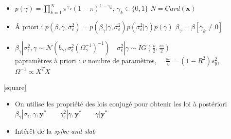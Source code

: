 \begin{frame}
        \begin{itemize}
            \item  $\displaystyle p(\gamma)=\prod_{k=1}^{N} \pi^{\gamma_k}(1-\pi)^{1-\gamma_k}$, $\gamma_k \in \{0,1 \}$ {\small $N = Card(\mathbf{x})$} 
            \item \'A priori : $p\left(\beta, \gamma, \sigma_{\varepsilon}^{2}\right)=p\left(\beta_{\gamma} | \gamma, \sigma_{\varepsilon}^{2}\right) p\left(\sigma_{\varepsilon}^{2} | \gamma\right) p(\gamma)$ 
            \hfill $\beta_{\gamma} = \beta[\gamma_k \neq 0]$
            \item $
                \beta_{\gamma}\left|\sigma_{\epsilon}^{2}, \gamma \sim \mathcal{N}\left(b_{\gamma},
                \sigma_{\epsilon}^{2}\left(\Omega_{\gamma}^{-1}\right)^{-1}\right) \quad \sigma_{\epsilon}^{2}\right| \gamma \sim IG\left(\frac{\nu}{2}, \frac{s s}{2}\right)
                $ \\ \vspace{0.2cm}
                {\centering \tiny
                papramètres à priori : $v$ nombre de paramètres,$\quad$ $\frac{s s}{v}=\left(1-R^{2}\right) s_{y}^{2}$, $\quad$         $\Omega^{-1} \propto X^{T} X$ }
        \end{itemize}
    
        [square]
   
    \begin{itemize}
        
        \item On utilise les propriété des lois conjugé pour obtenir les loi à postériori \\ \vspace{0.1cm}
        {\centering
        $\beta_{\gamma} | \sigma_{\epsilon}, \gamma, \mathbf{y}^{*} \quad \quad \gamma_\epsilon^{2} | \gamma, \mathbf{y}^{*} \quad \quad \gamma | \mathbf{y}^{*}$}
        \item Intérêt de la \textit{spike-and-slab}
    \end{itemize}

\end{frame}

